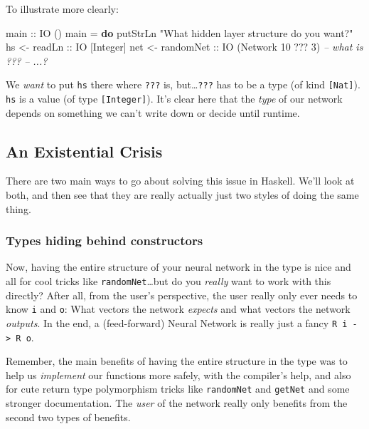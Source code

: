 \documentclass[]{article}
\newenvironment{Shaded}{}{}
\newcommand{\CommentTok}[1]{\textcolor[rgb]{0.38,0.63,0.69}{\textit{#1}}}
\newcommand{\DataTypeTok}[1]{\textcolor[rgb]{0.56,0.13,0.00}{#1}}
\newcommand{\DecValTok}[1]{\textcolor[rgb]{0.25,0.63,0.44}{#1}}
\newcommand{\FunctionTok}[1]{\textcolor[rgb]{0.02,0.16,0.49}{#1}}
\newcommand{\KeywordTok}[1]{\textcolor[rgb]{0.00,0.44,0.13}{\textbf{#1}}}
\newcommand{\NormalTok}[1]{#1}
\newcommand{\OtherTok}[1]{\textcolor[rgb]{0.00,0.44,0.13}{#1}}
\newcommand{\StringTok}[1]{\textcolor[rgb]{0.25,0.44,0.63}{#1}}
\begin{document}
To illustrate more clearly:

\begin{Shaded}
\begin{Highlighting}[]
\OtherTok{main ::} \DataTypeTok{IO}\NormalTok{ ()}
\NormalTok{main }\FunctionTok{=} \KeywordTok{do}
\NormalTok{    putStrLn }\StringTok{"What hidden layer structure do you want?"}
\NormalTok{    hs  }\OtherTok{<- readLn    ::} \DataTypeTok{IO}\NormalTok{ [}\DataTypeTok{Integer}\NormalTok{]}
\NormalTok{    net }\OtherTok{<- randomNet ::} \DataTypeTok{IO}\NormalTok{ (}\DataTypeTok{Network} \DecValTok{10} \FunctionTok{???} \DecValTok{3}\NormalTok{)   }\CommentTok{-- what is ???}
    \CommentTok{-- ...?}
\end{Highlighting}
\end{Shaded}

We \emph{want} to put \texttt{hs} there where \texttt{???} is,
but\ldots{}\texttt{???} has to be a type (of kind \texttt{{[}Nat{]}}).
\texttt{hs} is a value (of type \texttt{{[}Integer{]}}). It's clear here that
the \emph{type} of our network depends on something we can't write down or
decide until runtime.

\hypertarget{an-existential-crisis}{%
\subsection{An Existential Crisis}\label{an-existential-crisis}}

There are two main ways to go about solving this issue in Haskell. We'll look at
both, and then see that they are really actually just two styles of doing the
same thing.

\hypertarget{types-hiding-behind-constructors}{%
\subsubsection{Types hiding behind
constructors}\label{types-hiding-behind-constructors}}

Now, having the entire structure of your neural network in the type is nice and
all for cool tricks like \texttt{randomNet}\ldots{}but do you \emph{really} want
to work with this directly? After all, from the user's perspective, the user
really only ever needs to know \texttt{i} and \texttt{o}: What vectors the
network \emph{expects} and what vectors the network \emph{outputs}. In the end,
a (feed-forward) Neural Network is really just a fancy
\texttt{R\ i\ -\textgreater{}\ R\ o}.

Remember, the main benefits of having the entire structure in the type was to
help us \emph{implement} our functions more safely, with the compiler's help,
and also for cute return type polymorphism tricks like \texttt{randomNet} and
\texttt{getNet} and some stronger documentation. The \emph{user} of the network
really only benefits from the second two types of benefits.
\end{document}
